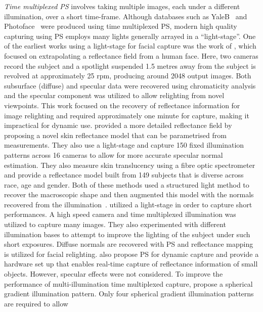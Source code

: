 \textit{Time multiplexed PS} involves taking multiple images, each under
a different illumination, over a short time-frame. Although databases such as
YaleB~\cite{RefWorks:314} and Photoface~\cite{RefWorks:293} were produced
using time multiplexed PS, modern high quality capturing using PS employs
many lights generally arrayed in a ``light-stage''. One of the earliest works
using a light-stage for facial capture was the work of 
\citet{debevec2000acquiring}, which focused on extrapolating a reflectance
field from a human face. Here, two cameras record the subject and a spotlight
suspended 1.5 metres away from the subject is revolved at approximately 25 rpm,
producing around 2048 output images. Both subsurface (diffuse) and specular data
were recovered using chromaticity analysis and the specular component was
utilized to allow relighting from novel viewpoints. This work focused on the
recovery of reflectance information for image relighting and required
approximately one minute for capture, making it impractical for dynamic use. 
\citet{weyrich2006analysis} provided a more
detailed reflectance field by proposing a novel skin reflectance model
that can be parametrised from measurements. They also use a light-stage and
capture 150 fixed illumination patterns across 16 cameras to allow for more 
accurate specular normal estimation. They also measure skin translucency
using a fibre optic spectrometer~\cite{nickell2000anisotropy} and provide
a reflectance model built from 149 subjects that is diverse across race, age and
gender. Both of these methods used a structured light method to recover
the macroscopic shape and then augmented this model with the normals
recovered from the illumination~\cite{nehab2005efficiently}. 
\citet{wenger2005performance} utilized a light-stage in order to capture
short performances. A high speed camera and time multiplexed illumination was
utilized to capture many images. They also experimented with different 
illumination bases to attempt to improve the lighting of the subject
under such short exposures. Diffuse normals are recovered with PS and 
reflectance mapping~\cite{miller1984illumination} is utilized for facial 
relighting. \citet{malzbender2006surface} also propose PS for dynamic
capture and provide a hardware set up that enables real-time capture
of reflectance information of small objects. However, specular effects
were not considered.
To improve the performance of multi-illumination time multiplexed
capture, \citet{ma2007rapid} propose a spherical gradient illumination pattern.
Only four spherical gradient illumination patterns are required to allow
